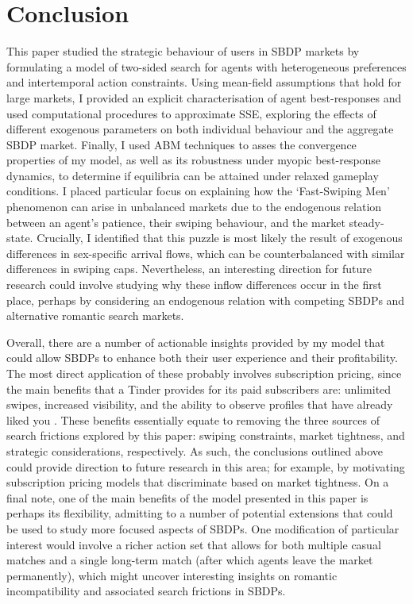 \section{Conclusion}
\label{sec:section5}
This paper studied the strategic behaviour of users in SBDP markets by formulating a model of two-sided search for agents with heterogeneous preferences and intertemporal action constraints. 
Using mean-field assumptions that hold for large markets, I provided an explicit characterisation of agent best-responses and used computational procedures to approximate SSE, exploring the effects of different exogenous parameters on both individual behaviour and the aggregate SBDP market.
Finally, I used ABM techniques to asses the convergence properties of my model, as well as its robustness under myopic best-response dynamics, to determine if equilibria can be attained under relaxed gameplay conditions.
I placed particular focus on explaining how the `Fast-Swiping Men' phenomenon can arise in unbalanced markets due to the endogenous relation between an agent's patience, their swiping behaviour, and the market steady-state. 
Crucially, I identified that this puzzle is most likely the result of exogenous differences in sex-specific arrival flows, which can be counterbalanced with similar differences in swiping caps. Nevertheless, an interesting direction for future research could involve studying why these inflow differences occur in the first place, perhaps by considering an endogenous relation with competing SBDPs and alternative romantic search markets. 

Overall, there are a number of actionable insights provided by my model that could allow SBDPs to enhance both their user experience and their profitability.
The most direct application of these probably involves subscription pricing, since the main benefits that a Tinder provides for its paid subscribers are: unlimited swipes, increased visibility, and the ability to observe profiles that have already liked you \citep{web:tinder_subscription}.
These benefits essentially equate to removing the three sources of search frictions explored by this paper: swiping constraints, market tightness, and strategic considerations, respectively.
As such, the conclusions outlined above could provide direction to future research in this area; for example, by motivating subscription pricing models that discriminate based on market tightness.
On a final note, one of the main benefits of the model presented in this paper is perhaps its flexibility, admitting to a number of potential extensions that could be used to study more focused aspects of SBDPs. 
One modification of particular interest would involve a richer action set that allows for both multiple casual matches and a single long-term match (after which agents leave the market permanently), which might uncover interesting insights on romantic incompatibility and associated search frictions in SBDPs.